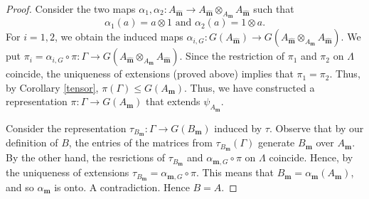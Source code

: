 \documentclass{amsart}
\theoremstyle{definition}
\theoremstyle{remark}
\begin{document}
\begin{proof}
 Consider the two maps $\alpha_1,\alpha_2:A_{\widehat{\mathbf m}}\to A_{\widehat{\mathbf m}}\otimes_{A_{ {\mathbf m}}} A_{\widehat{\mathbf m}}$ such that
 $$\alpha_1(a)=a\otimes 1 \textrm{\ and \ } \alpha_2(a)=1\otimes a.$$ For $i=1,2$, we obtain  the induced  maps 
 $\alpha_{i,G}: G(A_{\widehat{\mathbf m}})\to G( A_{\widehat{\mathbf m}}\otimes_{A_{ {\mathbf m}}} A_{\widehat{\mathbf m}})$. 
 We put $\pi_{i}=\alpha_{i,G}\circ \pi:\Gamma\to G (A_{\widehat{\mathbf m}}\otimes_{A_{ {\mathbf m}}} A_{\widehat{\mathbf m}})$. Since the restriction of $\pi_1$ and $\pi_2$ on $\Lambda$  coincide, the uniqueness of extensions (proved above)  implies that $\pi_1=\pi_2$. Thus, by Corollary \ref{tensor}, $\pi(\Gamma)\le G (A_{\mathbf m})$. Thus, we have constructed a representation $\pi:\Gamma\to G (A_{\mathbf m})$ that extends $\psi_{A_{\mathbf m}}$.

Consider the representation $\tau_{B_{\mathbf m}} :\Gamma\to G (B_{\mathbf m})$ induced by $\tau$. Observe that by our definition of $B$, the entries of the matrices from $\tau_{B_{\mathbf m}}(\Gamma)$ generate $B_{\mathbf m}$ over $A_{\mathbf m}$. By the other hand, the resrictions of $\tau_{B_{\mathbf m}}$ and $\alpha_{\mathbf m, G}\circ \pi$ on $\Lambda$ coincide. Hence, by  the uniqueness of extensions $\tau_{B_{\mathbf m}}=\alpha_{\mathbf m, G}\circ \pi$. This means that $B_{\mathbf m}=\alpha_{\mathbf m}(A_{\mathbf m})$, and so $\alpha_{\mathbf m}$ is onto. A contradiction. Hence $B=A$.
\end{proof}
\end{document}
